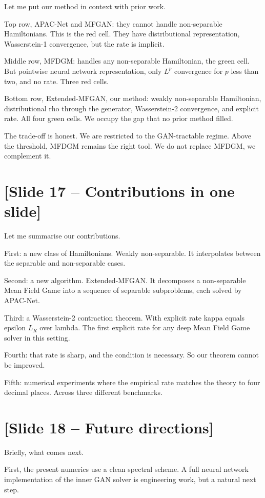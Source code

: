 \documentclass[11pt]{article}
\begin{document}
Let me put our method in context with prior work.

Top row, APAC-Net and MFGAN: they cannot handle non-separable Hamiltonians.
This is the red cell. They have distributional representation, Wasserstein-1
convergence, but the rate is implicit.

Middle row, MFDGM: handles any non-separable Hamiltonian, the green cell.
But pointwise neural network representation, only $L^p$ convergence for
$p$ less than two, and no rate. Three red cells.

Bottom row, Extended-MFGAN, our method: weakly non-separable Hamiltonian,
distributional rho through the generator, Wasserstein-2 convergence, and
explicit rate. All four green cells. We occupy the gap that no prior
method filled.

The trade-off is honest. We are restricted to the GAN-tractable regime.
Above the threshold, MFDGM remains the right tool. We do not replace
MFDGM, we complement it.

\section*{[Slide 17 -- Contributions in one slide]}

Let me summarise our contributions.

First: a new class of Hamiltonians. Weakly non-separable. It interpolates
between the separable and non-separable cases.

Second: a new algorithm. Extended-MFGAN. It decomposes a non-separable
Mean Field Game into a sequence of separable subproblems, each solved
by APAC-Net.

Third: a Wasserstein-2 contraction theorem. With explicit rate kappa
equals epsilon $L_R$ over lambda. The first explicit rate for any deep
Mean Field Game solver in this setting.

Fourth: that rate is sharp, and the condition is necessary. So our
theorem cannot be improved.

Fifth: numerical experiments where the empirical rate matches the theory
to four decimal places. Across three different benchmarks.

\section*{[Slide 18 -- Future directions]}

Briefly, what comes next.

First, the present numerics use a clean spectral scheme. A full neural
network implementation of the inner GAN solver is engineering work, but
a natural next step.
\end{document}
